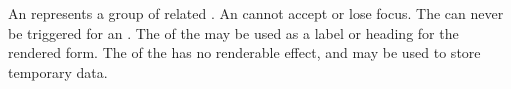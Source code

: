 An  represents a group of related . An  cannot accept or lose focus. The   can never be triggered for an . The  of the  may be used as a label or heading for the rendered form. The  of the  has no renderable effect, and may be used to store temporary data.